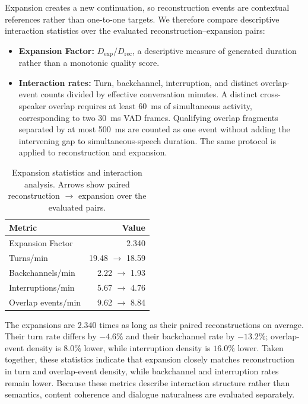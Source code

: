 \documentclass[10pt,twocolumn]{article}
\begin{document}
Expansion creates a new continuation, so reconstruction events are contextual references rather than one-to-one targets. We therefore compare descriptive interaction statistics over the evaluated reconstruction--expansion pairs:
\begin{itemize}
    \item \textbf{Expansion Factor:} $D_{\mathrm{exp}}/D_{\mathrm{rec}}$, a descriptive measure of generated duration rather than a monotonic quality score.
    \item \textbf{Interaction rates:} Turn, backchannel, interruption, and distinct overlap-event counts divided by effective conversation minutes. A distinct cross-speaker overlap requires at least 60~ms of simultaneous activity, corresponding to two 30~ms VAD frames. Qualifying overlap fragments separated by at most 500~ms are counted as one event without adding the intervening gap to simultaneous-speech duration. The same protocol is applied to reconstruction and expansion.
\end{itemize}

\begin{table}[t]
\centering
\caption{Expansion statistics and interaction analysis. Arrows show paired reconstruction $\rightarrow$ expansion over the evaluated pairs.}
\label{tab:expansion}
\small
\setlength{\tabcolsep}{4pt}
\begin{tabularx}{\columnwidth}{@{}Xr@{}}
\toprule
Metric & Value \\
\midrule
Expansion Factor & 2.340 \\
Turns/min & 19.48 $\rightarrow$ 18.59 \\
Backchannels/min & 2.22 $\rightarrow$ 1.93 \\
Interruptions/min & 5.67 $\rightarrow$ 4.76 \\
Overlap events/min & 9.62 $\rightarrow$ 8.84 \\
\bottomrule
\end{tabularx}
\end{table}

The expansions are 2.340 times as long as their paired reconstructions on average. Their turn rate differs by $-4.6\%$ and their backchannel rate by $-13.2\%$; overlap-event density is $8.0\%$ lower, while interruption density is $16.0\%$ lower. Taken together, these statistics indicate that expansion closely matches reconstruction in turn and overlap-event density, while backchannel and interruption rates remain lower. Because these metrics describe interaction structure rather than semantics, content coherence and dialogue naturalness are evaluated separately.
\end{document}
